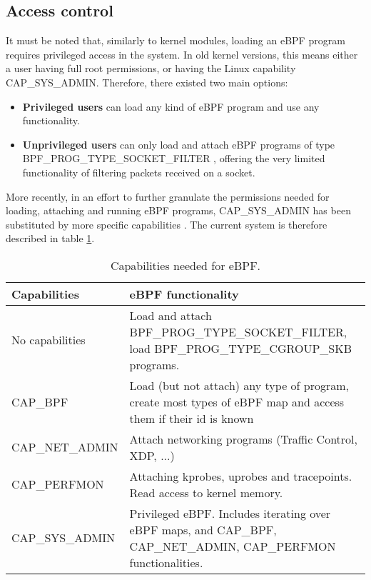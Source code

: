 \subsection{Access control} \label{subsection:access_control}
It must be noted that, similarly to kernel modules, loading an eBPF program requires privileged access in the system. In old kernel versions, this means either a user having full root permissions, or having the Linux capability \cite{ubuntu_caps} CAP\_SYS\_ADMIN. Therefore, there existed two main options:
\begin{itemize}
\item \textbf{Privileged users} can load any kind of eBPF program and use any functionality.
\item \textbf{Unprivileged users} can only load and attach eBPF programs of type BPF\_PROG\_TYPE\_SOCKET\_FILTER \cite{evil_ebpf_p9}, offering the very limited functionality of filtering packets received on a socket.
\end{itemize}

More recently, in an effort to further granulate the permissions needed for loading, attaching and running eBPF programs, CAP\_SYS\_ADMIN has been substituted by more specific capabilities \cite{ebpf_caps_intro} \cite{ebpf_caps_lwn}. The current system is therefore described in table \ref{table:ebpf_caps_current}.

\begin{table}[htbp]
\begin{tabular}{|>{\centering\arraybackslash}p{4cm}|>{\centering\arraybackslash}p{10cm}|}
\hline
Capabilities & eBPF functionality\\
\hline
\hline
No capabilities & Load and attach BPF\_PROG\_TYPE\_SOCKET\_FILTER, load BPF\_PROG\_TYPE\_CGROUP\_SKB programs.\\
\hline
CAP\_BPF & Load (but not attach) any type of program, create most types of eBPF map and access them if their id is known\\
\hline
CAP\_NET\_ADMIN & Attach networking programs (Traffic Control, XDP, ...)\\
\hline
CAP\_PERFMON & Attaching kprobes, uprobes and tracepoints. Read access to kernel memory.\\
\hline
CAP\_SYS\_ADMIN & Privileged eBPF. Includes iterating over eBPF maps, and CAP\_BPF, CAP\_NET\_ADMIN, CAP\_PERFMON functionalities.\\
\hline
\end{tabular}
\caption{Capabilities needed for eBPF.}
\label{table:ebpf_caps_current}
\end{table}

